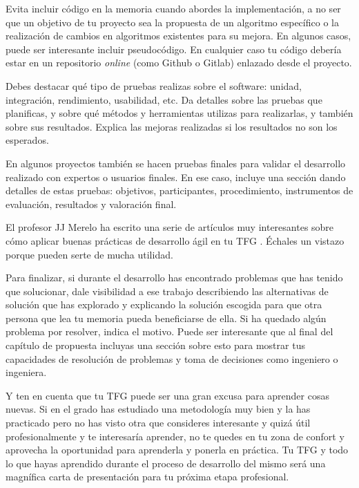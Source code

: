 Evita incluir código en la memoria cuando abordes la implementación, a no ser que un objetivo de tu proyecto sea la propuesta de un algoritmo específico o la realización de cambios en algoritmos existentes para su mejora. En algunos casos, puede ser interesante incluir pseudocódigo. En cualquier caso tu código debería estar en un repositorio \textit{online} (como Github o Gitlab) enlazado desde el proyecto.

Debes destacar qué tipo de pruebas realizas sobre el software: unidad, integración, rendimiento, usabilidad, etc. Da detalles sobre las pruebas que planificas, y sobre qué métodos y herramientas utilizas para realizarlas, y también sobre sus resultados. Explica las mejoras realizadas si los resultados no son los esperados. 

En algunos proyectos también se hacen pruebas finales para validar el desarrollo realizado con expertos o usuarios finales. En ese caso, incluye una sección dando detalles de estas pruebas: objetivos, participantes, procedimiento, instrumentos de evaluación, resultados y valoración final.

El profesor JJ Merelo ha escrito una serie de artículos muy interesantes sobre cómo aplicar buenas prácticas de desarrollo ágil en tu TFG \cite{TFGs2024JJ}. Échales un vistazo porque pueden serte de mucha utilidad. 

Para finalizar, si durante el desarrollo has encontrado problemas que has tenido que solucionar, dale visibilidad a ese trabajo describiendo las alternativas de solución que has explorado y explicando la solución escogida para que otra persona que lea tu memoria pueda beneficiarse de ella. Si ha quedado algún problema por resolver, indica el motivo. Puede ser interesante que al final del capítulo de propuesta incluyas una sección sobre esto para mostrar tus capacidades de resolución de problemas y toma de decisiones como ingeniero o ingeniera. 

Y ten en cuenta que tu TFG puede ser una gran excusa para aprender cosas nuevas. Si en el grado has estudiado una metodología muy bien y la has practicado pero no has visto otra que consideres interesante y quizá útil profesionalmente y te interesaría aprender, no te quedes en tu zona de confort y aprovecha la oportunidad para aprenderla y ponerla en práctica. Tu TFG y todo lo que hayas aprendido durante el proceso de desarrollo del mismo será una magnífica carta de presentación para tu próxima etapa profesional.
